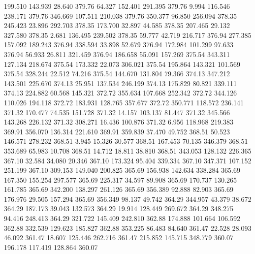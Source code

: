  199.510  143.939   28.640       379.76
  64.327  152.401  291.395       379.76
   9.994  116.546  238.171       379.76
 346.669  107.511  210.038       379.76
 350.377   96.850  256.094       378.35
 245.423   23.896  292.703       378.35
 173.700   32.897   44.585       378.35
 207.465   29.132  327.580       378.35
   2.681  136.495  239.502       378.35
  59.777   42.719  216.717       376.94
 277.385  157.092  189.243       376.94
 338.594   33.898   52.679       376.94
 172.984  101.299   97.633       376.94
  56.933   26.811  321.459       376.94
 186.658   55.091  157.269       375.54
 343.311  127.134  218.674       375.54
 173.332   22.073  306.021       375.54
 195.864  143.321  101.569       375.54
 328.244   22.512   74.216       375.54
 144.670  131.804   79.366       374.13
 347.212  143.501  225.670       374.13
  25.951  137.534  246.199       374.13
 175.829   80.821  339.111       374.13
 224.882   60.568  145.321       372.72
 355.634  107.668  252.342       372.72
 344.126  110.026  194.118       372.72
 183.931  128.765  357.677       372.72
 350.771  118.572  236.141       371.32
 170.477   74.535  151.728       371.32
  14.157  103.137   81.447       371.32
 345.566  143.268  226.132       371.32
 308.271   16.436  100.876       371.32
   6.956  118.968  219.383       369.91
 356.070  136.314  221.610       369.91
 359.839   37.470   49.752       368.51
  50.523  146.571  278.232       368.51
   3.945   15.326   30.577       368.51
 167.453   70.135  346.379       368.51
 353.689   65.983   10.708       368.51
  14.712   18.811   38.810       368.51
 343.053  128.132  226.365       367.10
  32.584   34.080   20.346       367.10
 173.324   95.404  339.334       367.10
 347.371  107.152  251.199       367.10
 309.153  149.040  200.825       365.69
 156.938  142.634  338.284       365.69
 167.350  155.254  297.577       365.69
 225.317   34.597   89.908       365.69
 170.737  130.265  161.785       365.69
 342.200  138.297  261.126       365.69
 356.389   92.888   82.903       365.69
 176.976   29.505  157.294       365.69
 356.349   98.137   49.742       364.29
 344.957   43.379   38.672       364.29
 187.173   39.043  132.573       364.29
  19.914  128.449  269.672       364.29
 348.275   94.416  248.413       364.29
 321.722  145.409  242.810       362.88
 174.888  101.664  106.592       362.88
 332.539  129.623  185.827       362.88
 353.225   86.483   84.640       361.47
  22.528   28.093   46.092       361.47
  18.607  125.446  262.716       361.47
 215.852  145.715  348.779       360.07
 196.178  117.419  128.864       360.07
